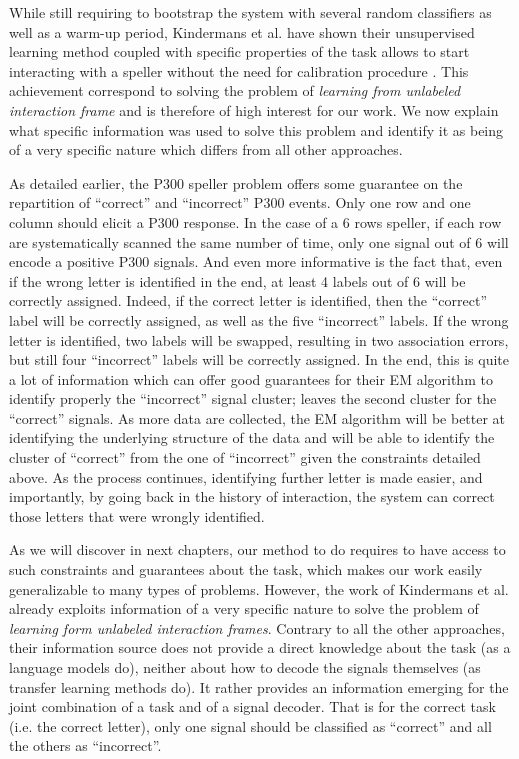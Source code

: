 While still requiring to bootstrap the system with several random classifiers as well as a warm-up period, Kindermans et al. have shown their unsupervised learning method coupled with specific properties of the task allows to start interacting with a speller without the need for calibration procedure \cite{Kindermans2012a,kindermans2014true}. This achievement correspond to solving the problem of \emph{learning from unlabeled interaction frame} and is therefore of high interest for our work. We now explain what specific information was used to solve this problem and identify it as being of a very specific nature which differs from all other approaches.

As detailed earlier, the P300 speller problem offers some guarantee on the repartition of ``correct'' and ``incorrect'' P300 events. Only one row and one column should elicit a P300 response. In the case of a 6 rows speller, if each row are systematically scanned the same number of time, only one signal out of 6 will encode a positive P300 signals. And even more informative is the fact that, even if the wrong letter is identified in the end, at least 4 labels out of 6 will be correctly assigned. Indeed, if the correct letter is identified, then the ``correct'' label will be correctly assigned, as well as the five ``incorrect'' labels. If the wrong letter is identified, two labels will be swapped, resulting in two association errors, but still four ``incorrect'' labels will be correctly assigned. In the end, this is quite a lot of information which can offer good guarantees for their EM algorithm to identify properly the ``incorrect'' signal cluster; leaves the second cluster for the ``correct'' signals. As more data are collected, the EM algorithm will be better at identifying the underlying structure of the data and will be able to identify the cluster of ``correct'' from the one of ``incorrect'' given the constraints detailed above. As the process continues, identifying further letter is made easier, and importantly, by going back in the history of interaction, the system can correct those letters that were wrongly identified.

As we will discover in next chapters, our method to do requires to have access to such constraints and guarantees about the task, which makes our work easily generalizable to many types of problems. However, the work of Kindermans et al. already exploits information of a very specific nature to solve the problem of \emph{learning form unlabeled interaction frames}. Contrary to all the other approaches, their information source does not provide a direct knowledge about the task (as a language models do), neither about how to decode the signals themselves (as transfer learning methods do). It rather provides an information emerging for the joint combination of a task and of a signal decoder. That is for the correct task (i.e. the correct letter), only one signal should be classified as ``correct'' and all the others as ``incorrect''. 

